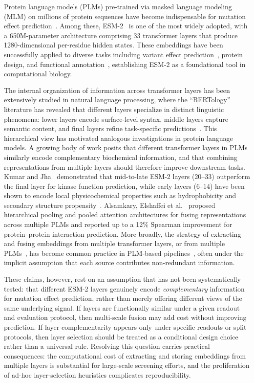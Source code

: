 \documentclass[11pt,a4paper]{article}
\newcommand{\rtwo}[1]{#1}
\begin{document}
Protein language models (PLMs) pre-trained via masked language modeling (MLM) on
millions of protein sequences have become indispensable for mutation effect
prediction~\cite{rives2021biological,meier2021language,lin2023evolutionary}.
Among these, ESM-2~\cite{lin2023evolutionary}
is one of the most widely adopted, with a 650M-parameter architecture comprising 33
transformer layers that produce 1280-dimensional per-residue hidden states. These
embeddings have been successfully applied to diverse tasks including variant effect
prediction~\cite{frazer2021disease,hie2021learning}, protein design, and functional
annotation~\cite{elnaggar2022prottrans,brandes2022proteinbert}, establishing ESM-2 as a
foundational tool in computational biology.

The internal organization of information across transformer layers has been
extensively studied in natural language processing, where the ``BERTology''
literature has revealed that different layers specialize
in distinct linguistic phenomena: lower layers encode surface-level syntax, middle
layers capture semantic content, and final layers refine task-specific
predictions~\rtwo{\cite{rogers2021bertology,tenney2019bert}}.
This hierarchical view has motivated analogous investigations in protein language
models. A growing body of work posits that different transformer layers in PLMs
similarly encode complementary biochemical information, and that combining
representations from multiple layers should therefore improve downstream tasks.
Kumar and Jha~\cite{kumar2025} demonstrated that mid-to-late ESM-2 layers (20--33)
outperform the final layer for kinase function prediction, while early layers
(6--14) have been shown to encode local physicochemical properties such as
hydrophobicity and secondary structure propensity~\cite{detlefsen2022}.
Alsamkary, Elshaffei et al.~\cite{elshaffei2025} proposed hierarchical pooling and
pooled attention architectures for fusing representations across multiple PLMs and
reported up to a 12\% Spearman improvement for protein--protein interaction
prediction. More broadly, the strategy of extracting and fusing embeddings from
multiple transformer layers\rtwo{, or from multiple PLMs~\cite{ko2026fusion,si2024contact},} has
become common practice in PLM-based pipelines~\cite{rao2019tape}, often under the
implicit assumption that each \rtwo{source} contributes non-redundant information.

These claims, however, rest on an assumption that has not been systematically tested:
that different ESM-2 layers genuinely encode \emph{complementary} information for
mutation effect prediction, rather than merely offering different views of the same
underlying signal. If layers are functionally similar under a given readout and
evaluation protocol, then multi-scale fusion may add cost without improving prediction.
If layer complementarity appears only under specific readouts or split protocols,
then layer selection should be treated as a conditional design choice rather than
a universal rule. Resolving this question carries practical
consequences: the computational cost of extracting and storing embeddings from
multiple layers is substantial for large-scale screening efforts, and the
proliferation of ad-hoc layer-selection heuristics complicates reproducibility.
\end{document}
